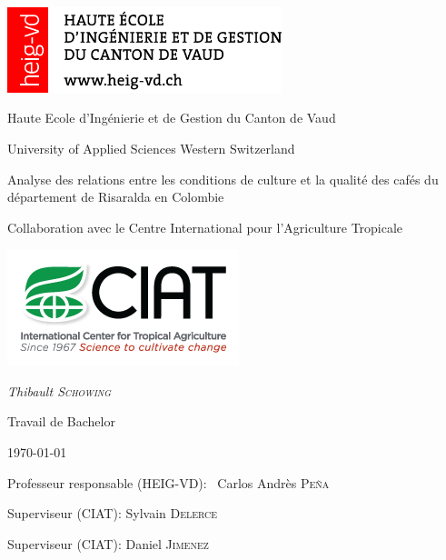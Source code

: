 \documentclass[11pt,a4paper,twoside,openright]{report}
\author{Thibault Schowing}
\newcommand\blankpage{%
	\null
	\thispagestyle{empty}%
	\addtocounter{page}{-1}%
	\newpage}
\begin{document}
	
	\pagestyle{plain}%
	\dominitoc
	
	
	\begin{titlepage}
		\centering
		
		\includegraphics[width=0.6\textwidth]{HEIG-VD_Logo_96x29_RVB_ROUGE}\par
		\vspace{0.5cm}
		\small{Haute Ecole d'Ingénierie et de Gestion du Canton de Vaud  \par}
		\footnotesize{University of Applied Sciences Western Switzerland\par}
		\vspace{1cm}
		
		
		
		\vspace{1cm}
		\Large{Analyse des relations entre les conditions de culture et la qualité des cafés du département de Risaralda en Colombie\par}
		\vspace{1.5cm}
		\small{Collaboration avec le Centre International pour l'Agriculture Tropicale  \par}
		\vspace{1cm}
		
		
		\includegraphics[width=0.4\linewidth]{img/CIAT_logo_light_PNG/CIAT-Logo-255x128}
		
		\vspace{2cm}
		\small\textit{Thibault \textsc{Schowing}}\par
		\small{Travail de Bachelor}\par
		\small{\today\par}
		
		\vfill
		Professeur responsable (HEIG-VD): ~Carlos Andrès \textsc{Peña}\par
		Superviseur (CIAT): Sylvain \textsc{Delerce} \par
		Superviseur (CIAT): Daniel \textsc{Jimenez}
		
		
	\end{titlepage}
	\restoregeometry 
	
\end{document}
